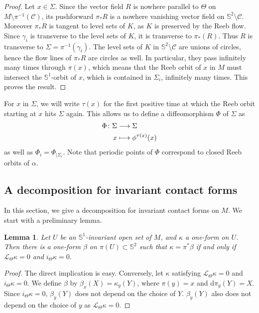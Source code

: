 \documentclass[10pt,a4paper]{amsart}
\newcommand{\bbS}{\mathbb{S}}
\newcommand{\clL}{\mathcal{L}}
\newcommand{\clC}{\mathcal{C}}
\newcommand{\rmd}{\mathrm{d}}
\renewcommand*{\to}{\mathchoice{\longrightarrow}{\rightarrow}{\rightarrow}{\rightarrow}}
\let\oldmapsto\mapsto
\renewcommand*{\mapsto}{\mathchoice{\longmapsto}{\oldmapsto}{\oldmapsto}{\oldmapsto}}
\newtheorem{lemm}[theo]{Lemma}
\theoremstyle{definition}\newtheorem{defi}[theo]{Definition}
\begin{document}
\begin{proof}
Let $x \in \Sigma$. Since the vector field $R$ is nowhere parallel to $\Theta$ on $M \setminus \pi^{-1}(\clC)$, its pushforward $\pi_{*}R$ is a nowhere vanishing vector field on $\bbS^2 \setminus \clC$. Moreover $\pi_{*}R$ is tangent to level sets of $K$, as $K$ is preserved by the Reeb flow. Since $\gamma_i$ is transverse to the level sets of $K$, it is transverse to $\pi_*(R)$. Thus $R$ is transverse to $\Sigma = \pi^{-1}(\gamma_i)$. The level sets of $K$ in $\bbS^2 \setminus \clC$ are unions of circles, hence the flow lines of $\pi_* R$ are circles as well. In particular, they pass infinitely many times through $\pi(x)$, which means that the Reeb orbit of $x$ in $M$ must intersect the $\bbS^1$-orbit of $x$, which is contained in $\Sigma_i$, infinitely many times. This proves the result.
\end{proof}

For $x$ in $\Sigma$, we will write $\tau(x)$ for the first positive time at which the Reeb orbit starting at $x$ hits $\Sigma$ again. This allows us to define a diffeomorphism $\Phi$ of $\Sigma$ as
\begin{align*}
\Phi  \colon  \Sigma &\to  \Sigma \\
 x &\mapsto \phi^{\tau(x)}(x)
\end{align*}
as well as $\Phi_i = \Phi_{|\Sigma_i}$. Note that periodic points of $\Phi$ correspond to closed Reeb orbits of $\alpha$.

\subsection{A decomposition for invariant contact forms}\label{sub:a_normal_form_for_invariant_contact_forms}

In this section, we give a decomposition for invariant contact forms on $M$. We start with a preliminary lemma.

\begin{lemm}\label{lemma:lift_form_quotient}
Let $U$ be an $\bbS^1$-invariant open set of $M$, and $\kappa$ a one-form on $U$. Then there is a one-form $\beta$ on $\pi(U) \subset \bbS^2$ such that $\kappa = \pi^* \beta$ if and only if $\clL_{\Theta} \kappa = 0$ and $i_{\Theta} \kappa = 0$.
\end{lemm}

\begin{proof}
The direct implication is easy. Conversely, let $\kappa$ satisfying $\clL_{\Theta} \kappa = 0$ and $i_{\Theta}\kappa = 0$. We define $\beta$ by $\beta_x(X) = \kappa_y(Y)$, where $\pi(y)=x$ and $\rmd  \pi_y(Y) = X$. Since $i_{\Theta} \kappa = 0$, $\beta_y(Y)$ does not depend on the choice of $Y$. $\beta_y(Y)$ also does not depend on the choice of $y$ as $\clL_{\Theta}\kappa = 0$.
\end{proof}
\end{document}

